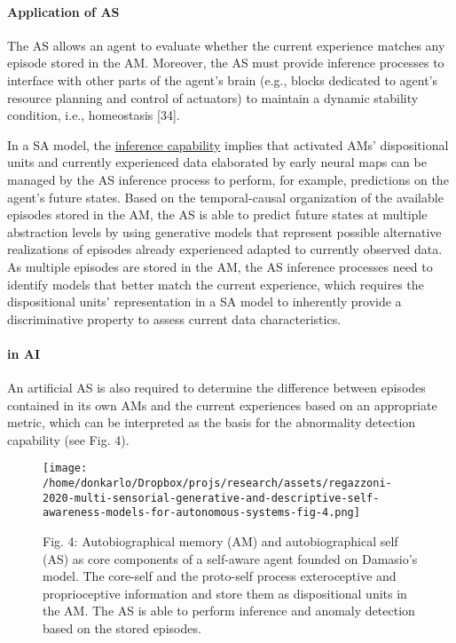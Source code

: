 \documentclass{article}
\begin{document}
			\paragraph{Application of AS}The AS allows an agent to evaluate whether the current experience matches any episode stored in the AM.  Moreover, the AS must provide inference processes to interface with other parts of the agent’s brain (e.g., blocks dedicated to agent’s
			resource planning and control of actuators) to maintain a dynamic stability condition, i.e., homeostasis \citet{regazzoni-2020-multi-sensorial-generative-and-descriptive-self-awareness-models-for-autonomous-systems}[34]. 
			
			In a SA model, the \underline{inference capability} implies that activated AMs’ dispositional units and currently experienced data elaborated by early neural maps can be managed by the AS inference process to perform, for example, predictions on the agent’s future states. Based on the temporal-causal organization of the available episodes stored in the AM, the AS is able to predict future states at multiple abstraction levels by using generative models that represent possible alternative realizations of episodes already experienced adapted to currently observed data. As multiple episodes are stored in the AM, the AS inference processes need to identify models that better match the current experience, which requires the dispositional units’ representation in a SA model to inherently provide a discriminative property to assess current data characteristics.
			
			
			\paragraph{in AI} An artificial AS is also required to determine the difference between episodes contained in its own AMs and the current
			experiences based on an appropriate metric, which can be interpreted as the basis for the abnormality detection capability
			(see Fig. 4). 
			\begin{figure*}
				\centering
				\texttt{[image: /home/donkarlo/Dropbox/projs/research/assets/regazzoni-2020-multi-sensorial-generative-and-descriptive-self-awareness-models-for-autonomous-systems-fig-4.png]}
				\caption{Fig. 4: Autobiographical memory (AM) and autobiographical self (AS) as core components of a self-aware agent founded on Damasio’s model. The core-self and the proto-self process exteroceptive and proprioceptive information and store them as dispositional units in the AM. The AS is able to perform inference and anomaly detection based on the stored episodes.
				}
				\label{fig:regazzoni-2020-multi-sensorial-generative-and-descriptive-self-awareness-models-for-autonomous-systems-fig-4.png}
			\end{figure*}
			
\end{document}
